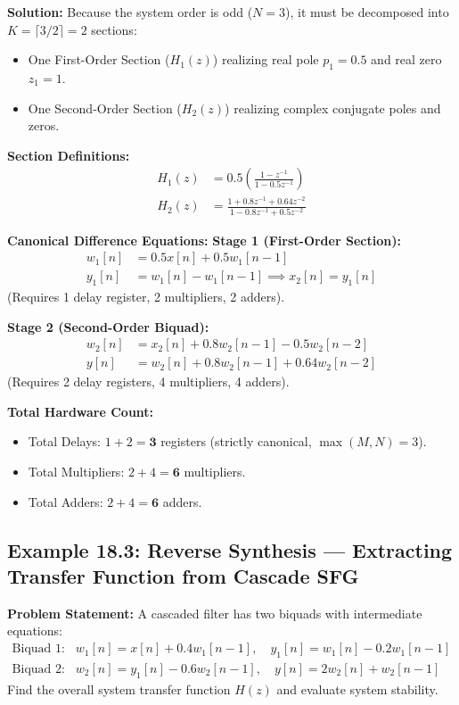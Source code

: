 \documentclass[11pt,a4paper]{article}
\begin{document}
\noindent\textbf{Solution:}
Because the system order is odd ($N = 3$), it must be decomposed into $K = \lceil 3/2 \rceil = 2$ sections:
\begin{itemize}
    \item One First-Order Section ($H_1(z)$) realizing real pole $p_1 = 0.5$ and real zero $z_1 = 1$.
    \item One Second-Order Section ($H_2(z)$) realizing complex conjugate poles and zeros.
\end{itemize}

\noindent\textbf{Section Definitions:}
\begin{align}
H_1(z) &= 0.5 \left( \frac{1 - z^{-1}}{1 - 0.5 z^{-1}} \right) \\
H_2(z) &= \frac{1 + 0.8 z^{-1} + 0.64 z^{-2}}{1 - 0.8 z^{-1} + 0.5 z^{-2}}
\end{align}

\noindent\textbf{Canonical Difference Equations:}
\textbf{Stage 1 (First-Order Section):}
\begin{align}
w_1[n] &= 0.5 x[n] + 0.5 w_1[n-1] \\
y_1[n] &= w_1[n] - w_1[n-1] \implies x_2[n] = y_1[n]
\end{align}
(Requires 1 delay register, 2 multipliers, 2 adders).

\textbf{Stage 2 (Second-Order Biquad):}
\begin{align}
w_2[n] &= x_2[n] + 0.8 w_2[n-1] - 0.5 w_2[n-2] \\
y[n] &= w_2[n] + 0.8 w_2[n-1] + 0.64 w_2[n-2]
\end{align}
(Requires 2 delay registers, 4 multipliers, 4 adders).

\textbf{Total Hardware Count:}
\begin{itemize}
    \item Total Delays: $1 + 2 = \mathbf{3}$ registers (strictly canonical, $\max(M, N) = 3$).
    \item Total Multipliers: $2 + 4 = \mathbf{6}$ multipliers.
    \item Total Adders: $2 + 4 = \mathbf{6}$ adders.
\end{itemize}

\vspace{0.4cm}
\subsection{Example 18.3: Reverse Synthesis — Extracting Transfer Function from Cascade SFG}
\textbf{Problem Statement:} A cascaded filter has two biquads with intermediate equations:
\begin{align*}
\text{Biquad 1:} \quad & w_1[n] = x[n] + 0.4 w_1[n-1], \quad y_1[n] = w_1[n] - 0.2 w_1[n-1] \\
\text{Biquad 2:} \quad & w_2[n] = y_1[n] - 0.6 w_2[n-1], \quad y[n] = 2 w_2[n] + w_2[n-1]
\end{align*}
Find the overall system transfer function $H(z)$ and evaluate system stability.
\end{document}
